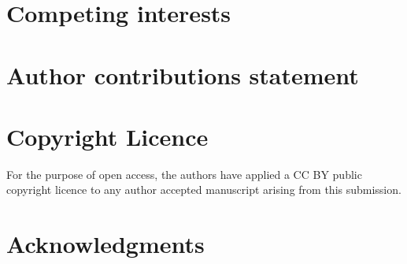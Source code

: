 \documentclass[numsec,webpdf,modern,medium,namedate]{oup-authoring-template}
\theoremstyle{thmstyleone}%
\theoremstyle{thmstyletwo}%
\theoremstyle{thmstylethree}%
\begin{document}

\maketitle










\begin{appendices}




\end{appendices}

\section*{Competing interests}

\section*{Author contributions statement}



\section*{Copyright Licence}
For the purpose of open access, the authors have applied a CC BY public copyright licence to any author accepted manuscript arising from this submission.


\section*{Acknowledgments}




\end{document}
